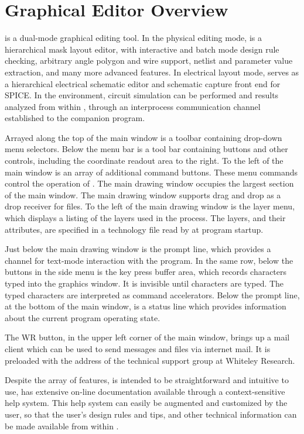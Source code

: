 \section{{\Xic} Graphical Editor Overview}

{\Xic} is a dual-mode graphical editing tool.  In the physical editing
mode, {\Xic} is a hierarchical mask layout editor, with interactive
and batch mode design rule checking, arbitrary angle polygon and wire
support, netlist and parameter value extraction, and many more
advanced features.  In electrical layout mode, {\Xic} serves as a
hierarchical electrical schematic editor and schematic capture front
end for SPICE.  In the {\XicTools} environment, circuit simulation can
be performed and results analyzed from within {\Xic}, through an
interprocess communication channel established to the companion
{\WRspice} program.

Arrayed along the top of the main window is a toolbar containing
drop-down menu selectors.  Below the menu bar is a tool bar containing
buttons and other controls, including the coordinate readout area to
the right.  To the left of the main window is an array of additional
command buttons.  These menu commands control the operation of {\Xic}. 
The main drawing window occupies the largest section of the main
window.  The main drawing window supports drag and drop as a drop
receiver for files.  To the left of the main drawing window is the
layer menu, which displays a listing of the layers used in the
process.  The layers, and their attributes, are specified in a
technology file read by {\Xic} at program startup.

Just below the main drawing window is the prompt line, which provides
a channel for text-mode interaction with the program.  In the same
row, below the buttons in the side menu is the key press buffer area,
which records characters typed into the graphics window.  It is
invisible until characters are typed.  The typed characters are
interpreted as command accelerators.  Below the prompt line, at the
bottom of the main window, is a status line which provides information
about the current program operating state.

The WR button, in the upper left corner of the main window, brings
up a mail client which can be used to send messages and files via
internet mail.  It is preloaded with the address of the technical
support group at Whiteley Research.

Despite the array of features, {\Xic} is intended to be
straightforward and intuitive to use, {\Xic} has extensive on-line
documentation available through a context-sensitive help system.  This
help system can easily be augmented and customized by the user, so
that the user's design rules and tips, and other technical information
can be made available from within {\Xic}.

